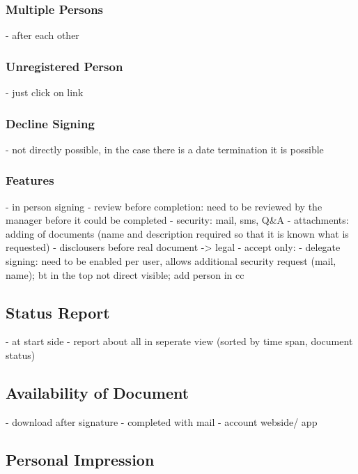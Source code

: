 \subsubsection{Multiple Persons}
- after each other

\subsubsection{Unregistered Person}
- just click on link

\subsubsection{Decline Signing}
- not directly possible, in the case there is a date termination it is possible

\subsubsection{Features}
- in person signing
- review before completion: need to be reviewed by the manager before it could be completed
- security: mail, sms, Q\&A
- attachments: adding of documents (name and description required so that it is known what is requested)
- disclousers before real document -> legal
- accept only: 
- delegate signing: need to be enabled per user, allows additional security request (mail, name); bt in the top not direct visible; add person in cc
\subsection{Status Report}
- at start side
- report about all in seperate view (sorted by time span, document status)

\subsection{Availability of Document}
- download after signature
- completed with mail
- account webside/ app

\subsection{Personal Impression}